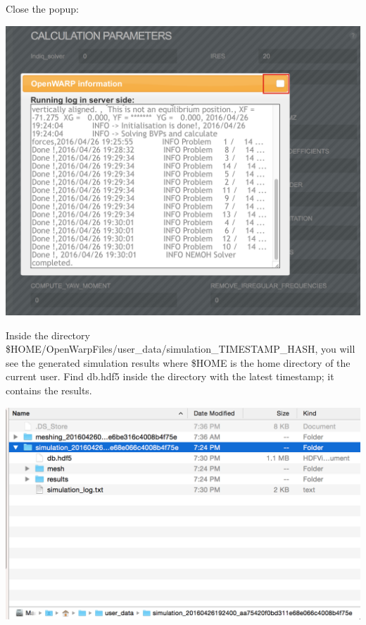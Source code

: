 \documentclass[12pt]{article}
\begin{document}
Close the popup:

\vspace{\abovedisplayskip}
\begin{minipage}{\linewidth}
	\centering
	\includegraphics[scale=0.5]{img/51}
\end{minipage}
\vspace{\belowdisplayskip}

Inside the directory \$HOME/OpenWarpFiles/user{\_}data/simulation{\_}TIMESTAMP{\_}HASH, you will see the generated simulation results where \$HOME is the home directory of the current user.
Find db.hdf5 inside the directory with the latest timestamp; it contains the results.

\vspace{\abovedisplayskip}
\begin{minipage}{\linewidth}
	\centering
	\includegraphics[scale=0.5]{img/52}
\end{minipage}
\vspace{\belowdisplayskip}
\end{document}
